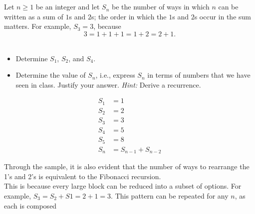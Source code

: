 \documentclass[12pt]{article}
\begin{document}

\begin{question} \\ \\
Let $n \geq 1$ be an integer and let $S_n$ be the number of ways in which 
$n$ can be written as a sum of $1$s and $2$s; the order in which the 
$1$s and $2$s occur in the sum matters. For example, $S_3 = 3$, because 
\[ 3 = 1 + 1 + 1 = 1 + 2 = 2 + 1 . 
\] \\
\parbox{\linewidth}{
\begin{itemize} 
\item Determine $S_1$, $S_2$, and $S_4$. 
\item Determine the value of $S_n$, i.e., express $S_n$ in terms of 
      numbers that we have seen in class. Justify your answer. 
      \emph{Hint:} Derive a recurrence. 
\end{itemize}}
\end{question} 
\begin{answer}
\begin{align*}
S_{1} &= 1 \\
S_{2} &= 2 \\
S_{3} &= 3 \\ 
S_{4} &= 5 \\
S_{5} &= 8 \\
S_{n} &= S_{n-1} + S_{n-2}
\end{align*}

Through the sample, it is also evident that the number of ways to rearrange the 1's and 2's is equivalent to the Fibonacci recursion. \\

This is because every large block can be reduced into a subset of options. For example, $S_{3} = S_{2} + S{1} = 2 + 1 = 3$. This pattern can be repeated for any $n$, as each is composed 
\end{answer}

\end{document}
